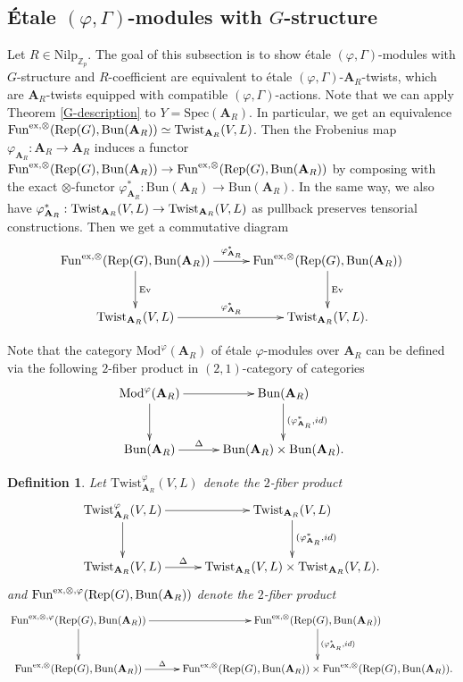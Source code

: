 \documentclass[10pt]{article}
\newtheorem{dfn}[thm]{Definition}
\numberwithin{equation}{section}
\newcommand{\bZ}{{\mathbb Z}}
\newcommand{\Bun}{{\mathrm{Bun}}}           %
\newcommand{\Mod}{{\mathrm{Mod}}}           %
\newcommand{\Rep}{{\mathrm{Rep}}}           %
\newcommand{\Spec}{{\mathrm{Spec}}}         %
\newcommand{\Nilp}{\mathrm{Nilp}}
\newcommand{\bfA}{{\textbf{A}}}
\newcommand{\Fun}{\mathrm{Fun}}
\newcommand{\Ev}{\mathrm{Ev}}
\newcommand{\Twist}{\mathrm{Twist}}
\begin{document}
\subsection{\'Etale $(\varphi,\Gamma)$-modules with $G$-structure}\label{subsec2.1}
Let $R\in \Nilp_{\bZ_p}$. The goal of this subsection is to show \'etale $(\varphi,\Gamma)$-modules with $G$-structure and $R$-coefficient are equivalent to \'etale $(\varphi,\Gamma)$-$\bfA_R$-twists, which are $\bfA_R$-twists equipped with compatible $(\varphi,\Gamma)$-actions.
Note that we can apply Theorem \ref{G-description} to $Y=\Spec(\bfA_R)$. In particular, we get an equivalence $\Fun^{{\rm ex},\otimes}(\Rep(G),\Bun(\bfA_R))\simeq {\rm Twist}_{\bfA_R}(V,L)$. Then the Frobenius map $\varphi_{\bfA_R}:\bfA_R\to \bfA_R$ induces a functor $\Fun^{{\rm ex},\otimes}(\Rep(G),\Bun(\bfA_R))\to \Fun^{{\rm ex},\otimes}(\Rep(G),\Bun(\bfA_R))$ by composing with the exact $\otimes$-functor $\varphi^*_{\bfA_R}:\Bun(\bfA_R)\to \Bun(\bfA_R)$. In the same way, we also have $\varphi^*_{\bfA_R}:{\rm Twist}_{\bfA_R}(V,L)\to {\rm Twist}_{\bfA_R}(V,L)$ as pullback preserves tensorial constructions. Then we get a commutative diagram
\begin{equation}\label{Diagram-1}
    \xymatrix@=1cm{
    \Fun^{{\rm ex},\otimes}(\Rep(G),\Bun(\bfA_R))\ar[d]^{\Ev}\ar[r]^{\varphi^*_{\bfA_R}} & \Fun^{{\rm ex},\otimes}(\Rep(G),\Bun(\bfA_R))\ar[d]^{\Ev}\\
    {\rm Twist}_{\bfA_R}(V,L)\ar[r]^{\varphi^*_{\bfA_R}} & {\rm Twist}_{\bfA_R}(V,L).
    }
\end{equation}

Note that the category $\Mod^{\varphi}(\bfA_R)$ of \'etale $\varphi$-modules over $\bfA_R$ can be defined via the following $2$-fiber product in $(2,1)$-category of categories
\begin{equation}\label{Diagram-2}
    \xymatrix@=1cm{
    \Mod^{\varphi}(\bfA_R)\ar[d]\ar[r] & \Bun(\bfA_R)\ar[d]^{(\varphi^*_{\bfA_R},id)}\\
    \Bun(\bfA_R)\ar[r]^-{\Delta}& \Bun(\bfA_R)\times \Bun(\bfA_R).
    }
\end{equation}

\begin{dfn}
    Let $\Twist^{\varphi}_{\bfA_R}(V,L)$ denote the $2$-fiber product
    \begin{equation}
    \xymatrix@=1cm{
    \Twist^{\varphi}_{\bfA_R}(V,L)\ar[d]\ar[r] & \Twist_{\bfA_R}(V,L)\ar[d]^{(\varphi^*_{\bfA_R},id)}\\
    \Twist_{\bfA_R}(V,L)\ar[r]^-{\Delta}& \Twist_{\bfA_R}(V,L)\times \Twist_{\bfA_R}(V,L).
    }
\end{equation}
and $\Fun^{{\rm ex},\otimes,\varphi}(\Rep(G),\Bun(\bfA_R))$ denote the $2$-fiber product
\begin{equation}
    \xymatrix@=1cm{
    \Fun^{{\rm ex},\otimes,\varphi}(\Rep(G),\Bun(\bfA_R))\ar[d]\ar[r] & \Fun^{{\rm ex},\otimes}(\Rep(G),\Bun(\bfA_R))\ar[d]^{(\varphi^*_{\bfA_R},id)} \\
    \Fun^{{\rm ex},\otimes}(\Rep(G),\Bun(\bfA_R))\ar[r]^-{\Delta} & \Fun^{{\rm ex},\otimes}(\Rep(G),\Bun(\bfA_R))\times \Fun^{{\rm ex},\otimes}(\Rep(G),\Bun(\bfA_R)).
    }
\end{equation}
\end{dfn}
\end{document}
